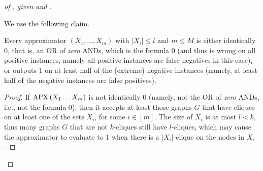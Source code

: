 \begin{proof}[of , given   and ]
\

We use the following claim. 

\begin{claim}\label{cla:internal-in-monotone-lower-bound}
 Every approximator  \APPX$\left(X_1, \ldots, X_m\right)$ with 
  $\left|X_i\right| \leq l$ and $m \leq M$ is either identically 0, that is, an OR of \emph{zero} ANDs, which is the formula $0$ (and thus is wrong on all positive instances, namely all positive instances are false negatives in this case), or outputs 1 on at least half of the (extreme) negative instances (namely, at least half of the negative instances are false positives).

\end{claim}
\begin{proof}
If $\operatorname{\mathrm{APX}}\left(X_1 \ldots X_m\right)$ is not identically 0 (namely, not the OR of \emph{zero} ANDs, i.e., not the formula $0$), then it accepts at least those graphs $G$ that have cliques on at least one of the sets $X_i$, for some $i\in[m]$. The size of $X_i$ is at most $ l<k$, thus many graphs $G$ that are not $k$-cliques still have $l$-cliques, which may cause the approximator to evaluate to 1 when there is a $|X_i|$-clique on the nodes in $X_i$.



\end{proof}
\end{proof}
